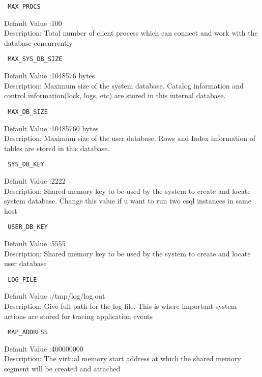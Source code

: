 \documentclass[12pt]{article}
\begin{document}
\begin{verbatim} MAX_PROCS \end{verbatim}
Default Value :100 \\
Description: Total number of client process which can connect and work with the database concurrently \\

\begin{verbatim} MAX_SYS_DB_SIZE \end{verbatim}
Default Value :1048576 bytes \\
Description: Maximum size of the system database. Catalog information and control information(lock, logs, etc) are stored in this internal database. \\

\begin{verbatim} MAX_DB_SIZE \end{verbatim}
Default Value :10485760 bytes \\
Description: Maximum size of the user database. Rows and Index information of tables are stored in this database.\\


\begin{verbatim} SYS_DB_KEY \end{verbatim}
Default Value :2222 \\
Description: Shared memory key to be used by the system to create and locate system database. Change this value if u want to run two csql instances in same host \\

\begin{verbatim} USER_DB_KEY \end{verbatim}
Default Value :5555 \\
Description: Shared memory key to be used by the system to create and locate user database \\

\begin{verbatim} LOG_FILE \end{verbatim}
Default Value :/tmp/log/log.out \\
Description: Give full path for the log file. This is  where important system actions are stored for tracing application events\\


\begin{verbatim} MAP_ADDRESS \end{verbatim}
Default Value :400000000 \\
Description: The virtual memory start address at which the shared memory segment will be created and attached\\
\end{document}
